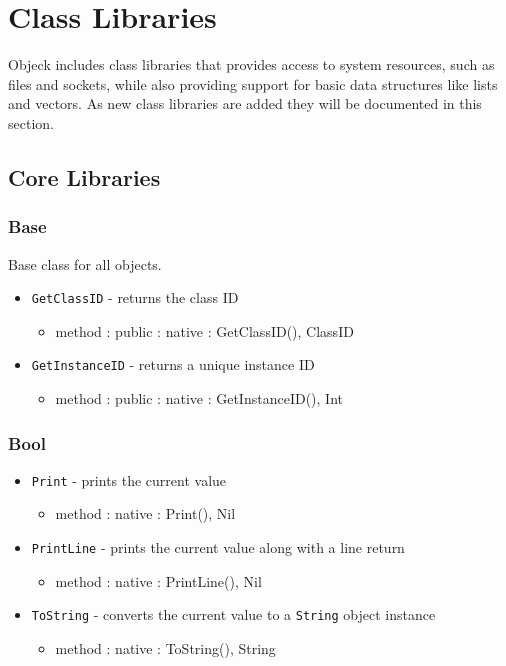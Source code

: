 \documentclass[12pt]{article}
\begin{document}
\section{Class Libraries}
Objeck includes class libraries that provides access to system resources, such as files and sockets, while also providing support for  basic data structures like lists and vectors.  As new class libraries are added they will be documented in this section.

\subsection{Core Libraries}
\subsubsection{Base}
Base class for all objects.
\begin{itemize}
    \item \texttt{GetClassID} - returns the class ID
    	\begin{itemize}
	\item method : public : native : GetClassID(), ClassID
	\end{itemize}
   \item \texttt{GetInstanceID} - returns a unique instance ID
    	\begin{itemize}
	\item method : public : native : GetInstanceID(), Int
	\end{itemize}
\end{itemize}

\subsubsection{Bool}
\begin{itemize}
    \item \texttt{Print} - prints the current value
    	\begin{itemize}
	\item method : native : Print(), Nil
	\end{itemize}
    \item \texttt{PrintLine} - prints the current value along with a line return
    	\begin{itemize}
	\item method : native : PrintLine(), Nil
	\end{itemize}
    \item \texttt{ToString} - converts the current value to a \texttt{String} object instance
   	\begin{itemize}
	\item method : native : ToString(), String
	\end{itemize}
\end{itemize}
\end{document}

